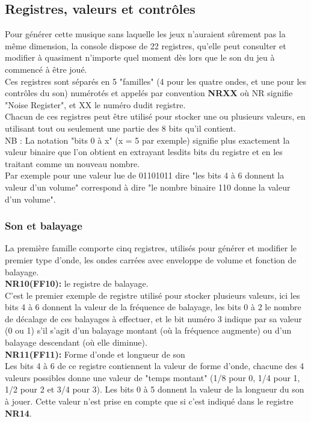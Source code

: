 \documentclass{report}
\begin{document}
\subsection{Registres, valeurs et contrôles} 
	Pour générer cette musique sans laquelle les jeux n'auraient
	sûrement pas la même dimension, la console dispose de 22
	registres, qu'elle peut consulter et modifier à quasiment
	n'importe quel moment dès lors que le son du jeu à commencé à
	être joué.\\
	Ces registres sont séparés en 5 "familles" (4 pour les quatre
	ondes, et une pour les contrôles du son) numérotés et appelés
	par convention \textbf{NRXX} où NR signifie "Noise Register", et XX le
	numéro dudit registre. \\
	Chacun de ces registres peut être utilisé pour stocker une
	ou plusieurs valeurs, en utilisant tout ou seulement une
	partie des 8 bits qu'il contient.\\

	NB : La notation "bits 0 à x" (x = 5 par exemple) signifie
	plus exactement la valeur binaire que l'on obtient en
	extrayant lesdits bits du registre et en les traitant comme un
	nouveau nombre.\\
	Par exemple pour une valeur lue de 01101011 dire "les bits 4 à
	6 donnent la valeur d'un volume" correspond à dire "le nombre binaire
	110 donne la valeur d'un volume".

	\subsubsection{Son et balayage}
	La première famille comporte cinq registres, utilisés pour
	générer et modifier le premier type d'onde, les ondes carrées
	avec enveloppe de volume et fonction de balayage.\\

	\textbf{NR10(FF10):} le registre de balayage.\\
		C'est le premier exemple de registre utilisé pour
		stocker plusieurs valeurs, ici les bits 4 à 6 donnent
		la valeur de la fréquence de balayage, les bits 0 à 2
		le nombre de décalage de ces balayages à effectuer, et le bit
		numéro 3 indique par sa valeur (0 ou 1) s'il s'agit
		d'un balayage montant (où la fréquence augmente) ou
		d'un balayage descendant (où elle diminue).\\ 
	
	\textbf{NR11(FF11):} Forme d'onde et longueur de son\\
		Les bits 4 à 6 de ce registre contiennent la valeur de
		forme d'onde, chacune des 4 valeurs possibles donne
		une valeur de "temps montant" (1/8 pour 0, 1/4 pour
		1, 1/2 pour 2 et 3/4 pour 3).
		Les bits 0 à 5 donnent la valeur de la longueur
		du son à jouer. Cette valeur n'est prise en
		compte que si c'est indiqué dans le registre \textbf{NR14}.\\
	
\end{document}
